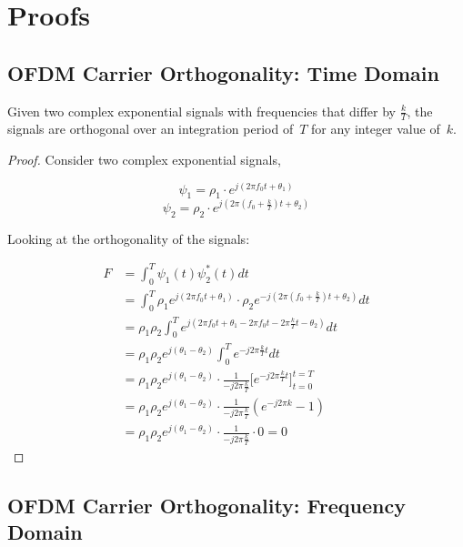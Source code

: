 \documentclass[class=report,11pt,crop=false]{standalone}
\begin{document}
\chapter{Proofs}

\section{OFDM Carrier Orthogonality: Time Domain \label{sect:proofs_ofdm-time}}

    Given two complex exponential signals with frequencies that differ by \(\frac{k}{T}\), the signals are orthogonal over an integration period of~\(T\) for any integer value of~\(k\).

\begin{proof}
    Consider two complex exponential signals,
    
    \begin{equation}
        \psi_1 = \rho_1 \cdot e^{j(2\pi f_0 t + \theta_1)}
    \end{equation}
    \begin{equation}
        \psi_2 = \rho_2 \cdot e^{j(2\pi (f_0 + \frac{k}{T})t + \theta_2)}
    \end{equation}

    Looking at the orthogonality of the signals:
    
        \setlength{\jot}{10pt}
        \begin{align}
            F &= \int_0^T \psi_1(t) \psi_2^*(t) dt \\
            &= \int_0^T \rho_1 e^{j(2\pi f_0 t + \theta_1)} \cdot \rho_2 e^{-j(2\pi (f_0 + \frac{k}{T})t + \theta_2)} dt \\
            &= \rho_1 \rho_2 \int_0^T e^{j(2\pi f_0 t + \theta_1 - 2\pi f_0 t - 2\pi \frac{k}{T}t - \theta_2)} dt \\
            &= \rho_1 \rho_2 e^{j(\theta_1 - \theta_2)} \int_0^T e^{-j 2\pi \frac{k}{T} t} dt \\
            &= \rho_1 \rho_2 e^{j(\theta_1 - \theta_2)} \cdot \frac{1}{-j2\pi\frac{k}{T}} \bigg[ e^{-j2\pi\frac{k}{T} t} \bigg]^{t=T}_{t=0} \\
            &= \rho_1 \rho_2 e^{j(\theta_1 - \theta_2)} \cdot \frac{1}{-j2\pi\frac{k}{T}} (e^{-j2\pi k} - 1) \\
            &= \rho_1 \rho_2 e^{j(\theta_1 - \theta_2)} \cdot \frac{1}{-j2\pi\frac{k}{T}} \cdot 0 = 0
        \end{align}
    
\end{proof}


\section{OFDM Carrier Orthogonality: Frequency Domain \label{sect:proofs_ofdm-freq}}


\ifstandalone
% 
\fi
\end{document}
